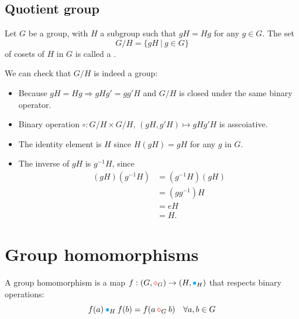 \subsection{Quotient group}

\begin{definition}
    Let $G$ be a group, with $H$ a subgroup such that $gH = Hg$ for any $g \in G$. The set 
    \[
        G/H = \{ gH \> | \> g \in G \}
    \]
    of cosets of $H$ in $G$ is called a .
\end{definition}

We can check that $G/H$ is indeed a group:
\begin{itemize}
    \item Because $gH=Hg \Longrightarrow gHg' = gg'H$ and $G/H$ is closed under the same binary operator.
    \item Binary operation $\circ : G/H \times G/H$, $(gH, g'H) \mapsto gHg'H$ is asscoiative.
    \item The identity element is $H$ since $H(gH) = gH$ for any $g$ in $G$.
    \item The inverse of $gH$ is $g^{-1}H$, since 
    \begin{align*}
        (gH)(g^{-1}H) &= (g^{-1}H)(gH)\\
        &= (gg^{-1})H\\
        &= eH\\
        &= H.
    \end{align*}
\end{itemize}

\section{Group homomorphisms}

\begin{definition}
    A group homomorphism is a map $f: (G,{\color{red} \diamond}_G) \to (H, {\color{cyan} \bullet}_H)$ that respects binary operations:
    \begin{equation}
        f(a) \> {\color{cyan} \bullet}_H \> f(b) = f(a \> {\color{red} \diamond}_G \> b) \quad \forall a, b \in G
    \end{equation}
\end{definition}

